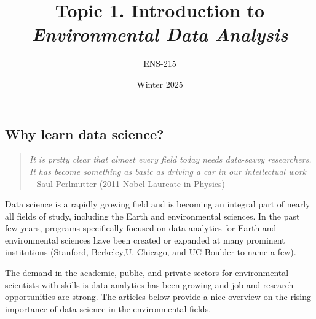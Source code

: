 \documentclass[
]{article}
\title{Topic 1. Introduction to \emph{Environmental Data Analysis}}
\author{ENS-215}
\date{Winter 2025}
\begin{document}
\maketitle

{
\setcounter{tocdepth}{2}
\tableofcontents
}
\hypertarget{why-learn-data-science}{%
\subsection{Why learn data science?}\label{why-learn-data-science}}

\begin{quote}
\emph{It is pretty clear that almost every field today needs data-savvy
researchers. It has become something as basic as driving a car in our
intellectual work}\\
-- Saul Perlmutter (2011 Nobel Laureate in Physics)
\end{quote}

Data science is a rapidly growing field and is becoming an integral part
of nearly all fields of study, including the Earth and environmental
sciences. In the past few years, programs specifically focused on data
analytics for Earth and environmental sciences have been created or
expanded at many prominent institutions (Stanford, Berkeley,U. Chicago,
and UC Boulder to name a few).

The demand in the academic, public, and private sectors for
environmental scientists with skills is data analytics has been growing
and job and research opportunities are strong. The articles below
provide a nice overview on the rising importance of data science in the
environmental fields.
\end{document}
